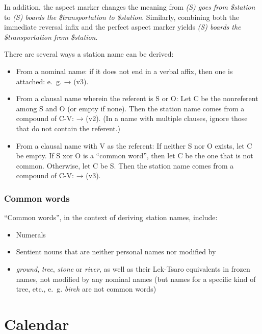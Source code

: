 \documentclass{book}
\begin{document}
In addition, the aspect marker  changes the meaning from \emph{(S) goes from \$station} to \emph{(S) boards the \$transportation to \$station}. Similarly, combining both the immediate reversal infix and the perfect aspect marker yields \emph{(S) boards the \$transportation from \$station}.

There are several ways a station name can be derived:

\begin{itemize}
    \item From a nominal name: if it does not end in a verbal affix, then one is attached: e.~g.  →  (v3).
    \item From a clausal name wherein the referent is S or O: Let C be the nonreferent among S and O (or empty if none). Then the station name comes from a compound of C-V:  →  (v2). (In a name with multiple clauses, ignore those that do not contain the referent.)
    \item From a clausal name with V as the referent: If neither S nor O exists, let C be empty. If S xor O is a ``common word'', then let C be the one that is not common. Otherwise, let C be S. Then the station name comes from a compound of C-V:  →  (v3).
\end{itemize}

\subsection{Common words}

``Common words'', in the context of deriving station names, include:

\begin{itemize}
    \item Numerals
    \item Sentient nouns that are neither personal names nor modified by 
    \item {} \emph{ground},  \emph{tree},  \emph{stone} or  \emph{river}, as well as their Lek-Tsaro equivalents in frozen names, not modified by any nominal names (but names for a specific kind of tree, etc., e.~g.  \emph{birch} are not common words)
\end{itemize}

\chapter{Calendar}
\end{document}
